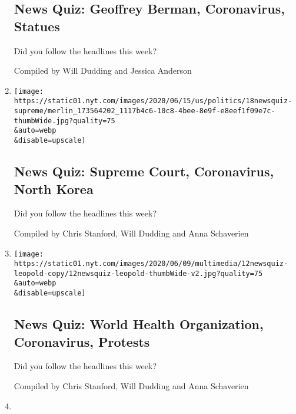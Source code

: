 \begin{enumerate}
  \hypertarget{news-quiz-geoffrey-berman-coronavirus-statues}{%
  \subsection{News Quiz: Geoffrey Berman, Coronavirus,
  Statues}\label{news-quiz-geoffrey-berman-coronavirus-statues}}

  Did you follow the headlines this week?

  Compiled by Will Dudding and Jessica Anderson
\item
  \href{/interactive/2020/06/19/briefing/supreme-court-coronavirus-north-korea-news-quiz.html}{}

  \texttt{[image: https://static01.nyt.com/images/2020/06/15/us/politics/18newsquiz-supreme/merlin\_173564202\_1117b4c6-10c8-4bee-8e9f-e8eef1f09e7c-thumbWide.jpg?quality=75\\\&auto=webp\\\&disable=upscale]}

  \hypertarget{news-quiz-supreme-court-coronavirus-north-korea}{%
  \subsection{News Quiz: Supreme Court, Coronavirus, North
  Korea}\label{news-quiz-supreme-court-coronavirus-north-korea}}

  Did you follow the headlines this week?

  Compiled by Chris Stanford, Will Dudding and Anna Schaverien
\item
  \href{/interactive/2020/06/12/briefing/world-health-organization-coronavirus-protests-news-quiz.html}{}

  \texttt{[image: https://static01.nyt.com/images/2020/06/09/multimedia/12newsquiz-leopold-copy/12newsquiz-leopold-thumbWide-v2.jpg?quality=75\\\&auto=webp\\\&disable=upscale]}

  \hypertarget{news-quiz-world-health-organization-coronavirus-protests}{%
  \subsection{News Quiz: World Health Organization, Coronavirus,
  Protests}\label{news-quiz-world-health-organization-coronavirus-protests}}

  Did you follow the headlines this week?

  Compiled by Chris Stanford, Will Dudding and Anna Schaverien
\item
  \href{/interactive/2020/06/05/briefing/protests-hong-kong-primary-elections-news-quiz.html}{}


\end{enumerate}

